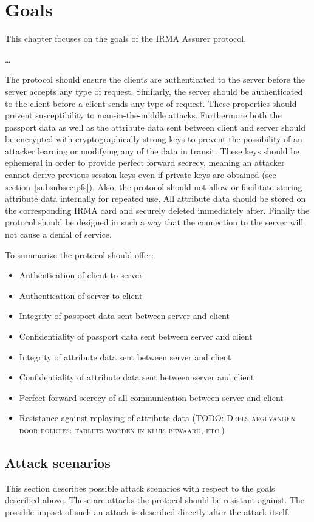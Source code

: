 \section{Goals}
This chapter focuses on the goals of the IRMA Assurer protocol.

\ldots

The protocol should ensure the clients are authenticated to the server before the server accepts any type of request. Similarly, the server should be authenticated to the client before a client sends any type of request. These properties should prevent susceptibility to man-in-the-middle attacks. Furthermore both the passport data as well as the attribute data sent between client and server should be encrypted with cryptographically strong keys to prevent the possibility of an attacker learning or modifying any of the data in transit. These keys should be ephemeral in order to provide perfect forward secrecy, meaning an attacker cannot derive previous session keys even if private keys are obtained (see section~\ref{subsubsec:pfs}). Also, the protocol should not allow or facilitate storing attribute data internally for repeated use. All attribute data should be stored on the corresponding IRMA card and securely deleted immediately after. Finally the protocol should be designed in such a way that the connection to the server will not cause a denial of service.

To summarize the protocol should offer:
\begin{itemize}
  \item Authentication of client to server
  \item Authentication of server to client
  \item Integrity of passport data sent between server and client
  \item Confidentiality of passport data sent between server and client
  \item Integrity of attribute data sent between server and client
  \item Confidentiality of attribute data sent between server and client
  \item Perfect forward secrecy of all communication between server and client
  \item Resistance against replaying of attribute data (\textsc{TODO: Deels afgevangen door policies: tablets worden in kluis bewaard, etc.})
\end{itemize}

\subsection{Attack scenarios}
This section describes possible attack scenarios with respect to the goals described above. These are attacks the protocol should be resistant against. The possible impact of such an attack is described directly after the attack itself.

